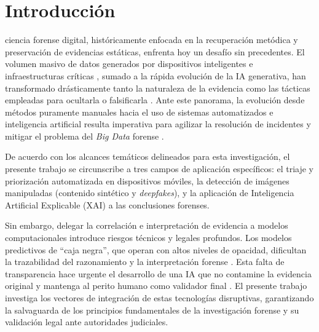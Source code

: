\documentclass[journal]{IEEEtran}
\begin{document}
\section{Introducción}
 ciencia forense digital, históricamente enfocada en la recuperación metódica y preservación de evidencias estáticas, enfrenta hoy un desafío sin precedentes. El volumen masivo de datos generados por dispositivos inteligentes e infraestructuras críticas \cite{KimSungbum2022Addf}, sumado a la rápida evolución de la IA generativa, han transformado drásticamente tanto la naturaleza de la evidencia como las tácticas empleadas para ocultarla o falsificarla \cite{10.1145/3733102.3733138}. Ante este panorama, la evolución desde métodos puramente manuales hacia el uso de sistemas automatizados e inteligencia artificial resulta imperativa para agilizar la resolución de incidentes y mitigar el problema del \textit{Big Data} forense \cite{ShailjaSingh2026TEoF, QuickDarren2014Ioiv}.

De acuerdo con los alcances temáticos delineados para esta investigación, el presente trabajo se circunscribe a tres campos de aplicación específicos: el triaje y priorización automatizada en dispositivos móviles, la detección de imágenes manipuladas (contenido sintético y \textit{deepfakes}), y la aplicación de Inteligencia Artificial Explicable (XAI) a las conclusiones forenses.

Sin embargo, delegar la correlación e interpretación de evidencia a modelos computacionales introduce riesgos técnicos y legales profundos. Los modelos predictivos de ``caja negra'', que operan con altos niveles de opacidad, dificultan la trazabilidad del razonamiento y la interpretación forense \cite{SharmaDevanshu2026LaEI}. Esta falta de transparencia hace urgente el desarrollo de una IA que no contamine la evidencia original y mantenga al perito humano como validador final \cite{VASILARAS2024301737}. El presente trabajo investiga los vectores de integración de estas tecnologías disruptivas, garantizando la salvaguarda de los principios fundamentales de la investigación forense y su validación legal ante autoridades judiciales.

\end{document}
